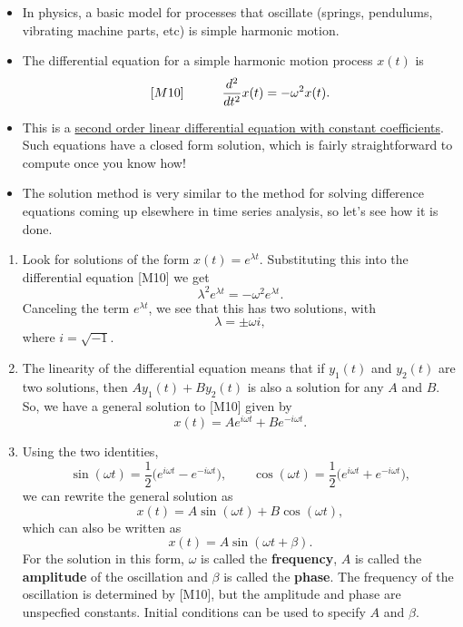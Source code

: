 \documentclass[]{article}
\begin{document}
\begin{itemize}
\item
  In physics, a basic model for processes that oscillate (springs,
  pendulums, vibrating machine parts, etc) is simple harmonic motion.
\item
  The differential equation for a simple harmonic motion process
  \(x(t)\) is $${[}M10{]}
  \quad\quad\quad \frac{d^2}{dt^2} x(t) = -\omega^2 x(t).$$
\item
  This is a
  \href{https://en.wikipedia.org/wiki/Linear_differential_equation\#Homogeneous_equations_with_constant_coefficients}{second
  order linear differential equation with constant coefficients}. Such
  equations have a closed form solution, which is fairly straightforward
  to compute once you know how!
\item
  The solution method is very similar to the method for solving
  difference equations coming up elsewhere in time series analysis, so
  let's see how it is done.
\end{itemize}

\begin{enumerate}
\def\labelenumi{\arabic{enumi}.}
\item
  Look for solutions of the form \(x(t)=e^{\lambda t}\). Substituting
  this into the differential equation {[}M10{]} we get
  \[ \lambda^2 e^{\lambda t} = -\omega^2 e^{\lambda t}.\] Canceling the
  term \(e^{\lambda t}\), we see that this has two solutions, with
  \[ \lambda = \pm \omega i,\] where \(i=\sqrt{-1}\).
\item
  The linearity of the differential equation means that if \(y_1(t)\)
  and \(y_2(t)\) are two solutions, then \(Ay_1(t)+By_2(t)\) is also a
  solution for any \(A\) and \(B\). So, we have a general solution to
  {[}M10{]} given by \[ x(t) = A e^{i\omega t} + B e^{-i\omega t}.\]
\item
  Using the two identities,
  \[\sin(\omega t) = \frac{1}{2}\big(e^{i\omega t} - e^{-i\omega t}\big), 
  \quad\quad 
  \cos(\omega t) = \frac{1}{2}\big(e^{i\omega t} + e^{-i\omega t}\big), 
  \] we can rewrite the general solution as
  \[ x(t) = A \sin(\omega t) + B\cos(\omega t),\] which can also be
  written as \[ x(t) = A\sin(\omega t + \beta).\] For the solution in
  this form, \(\omega\) is called the \textbf{frequency}, \(A\) is
  called the \textbf{amplitude} of the oscillation and \(\beta\) is
  called the \textbf{phase}. The frequency of the oscillation is
  determined by {[}M10{]}, but the amplitude and phase are unspecfied
  constants. Initial conditions can be used to specify \(A\) and
  \(\beta\).
\end{enumerate}
\end{document}
